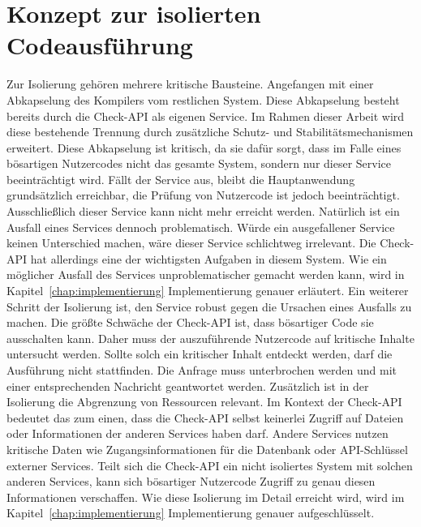 \section{Konzept zur isolierten Codeausführung}
Zur Isolierung gehören mehrere kritische Bausteine. Angefangen mit einer Abkapselung des Kompilers vom restlichen System. Diese Abkapselung besteht bereits durch die Check-API als eigenen Service. Im Rahmen dieser Arbeit wird diese bestehende Trennung durch zusätzliche Schutz- und Stabilitätsmechanismen erweitert. Diese Abkapselung ist kritisch, da sie dafür sorgt, dass im Falle eines bösartigen Nutzercodes nicht das gesamte System, sondern nur dieser Service beeinträchtigt wird. Fällt der Service aus, bleibt die Hauptanwendung grundsätzlich erreichbar, die Prüfung von Nutzercode ist jedoch beeinträchtigt. Ausschließlich dieser Service kann nicht mehr erreicht werden. Natürlich ist ein Ausfall eines Services dennoch problematisch. Würde ein ausgefallener Service keinen Unterschied machen, wäre dieser Service schlichtweg irrelevant. Die Check-API hat allerdings eine der wichtigsten Aufgaben in diesem System. Wie ein möglicher Ausfall des Services unproblematischer gemacht werden kann, wird in Kapitel~\ref{chap:implementierung} Implementierung genauer erläutert.
Ein weiterer Schritt der Isolierung ist, den Service robust gegen die Ursachen eines Ausfalls zu machen. Die größte Schwäche der Check-API ist, dass bösartiger Code sie ausschalten kann. Daher muss der auszuführende Nutzercode auf kritische Inhalte untersucht werden. Sollte solch ein kritischer Inhalt entdeckt werden, darf die Ausführung nicht stattfinden. Die Anfrage muss unterbrochen werden und mit einer entsprechenden Nachricht geantwortet werden.
Zusätzlich ist in der Isolierung die Abgrenzung von Ressourcen relevant. Im Kontext der Check-API bedeutet das zum einen, dass die Check-API selbst keinerlei Zugriff auf Dateien oder Informationen der anderen Services haben darf. Andere Services nutzen kritische Daten wie Zugangsinformationen für die Datenbank oder API-Schlüssel externer Services. Teilt sich die Check-API ein nicht isoliertes System mit solchen anderen Services, kann sich bösartiger Nutzercode Zugriff zu genau diesen Informationen verschaffen. Wie diese Isolierung im Detail erreicht wird, wird im Kapitel~\ref{chap:implementierung} Implementierung genauer aufgeschlüsselt.

